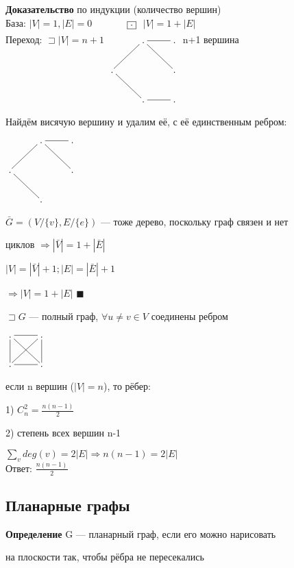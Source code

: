 \documentclass[a4paper, 12pt] {article}
\begin{document}
\textbf{Доказательство} по индукции (количество вершин)\\

База: $ |V| = 1, |E| = 0 $
$\xymatrix{
	& \fbox{.} \\
}$ $ |V| = 1 + |E| $\\

Переход: $ \sqsupset  |V| = n+1$
$\xymatrix{
	& . \ar@{-}[r] \ar@{-}[rd]. & .\\
	. \ar@{-}[ru] \ar@{-}[rd] & & .\\
	& . \ar@{-}[r] & . \\
}$ n+1 вершина

Найдём висячую вершину и удалим её, с её единственным ребром:

$\xymatrix{
	& . \ar@{-}[r] \ar@{-}[rd]. & .\\
	. \ar@{-}[ru] \ar@{-}[rd] & & .\\
	& .  \\
}$

$ \bar G = (V / \{v\}, E / \{e\}) $ --- тоже дерево, поскольку граф связен и нет 

циклов $ \Rightarrow |\bar V| = 1 + |\bar E| $

$ |V| = |\bar V| + 1; |E| = |\bar E| + 1 $

$ \Rightarrow  |V| = 1 + |E| $ $ \blacksquare  $

\newpage
$ \sqsupset G$ --- полный граф, $ \forall u \ne v \in V $ соединены ребром

$\xymatrix{
	. \ar@{-}[r] \ar@{-}[rd] & . \ar@{-}[d] \ar@{-}[ld]\\
    . \ar@{-}[u] \ar@{-}[r]  & . \\ 
}$

если n вершин ($ |V| = n $), то рёбер:

1) $C_{n}^{2}=\frac{n(n-1)}{2}$

2) степень всех вершин n-1

$ \sum_v deg(v) =	2|E| \Rightarrow n(n-1) = 2|E| $\\


Ответ: $ \frac{n(n-1)}{2} $

\subsection{Планарные графы}

\textbf{Определение} G --- планарный граф, если его можно нарисовать 

на плоскости так, чтобы рёбра не пересекались
\end{document}
